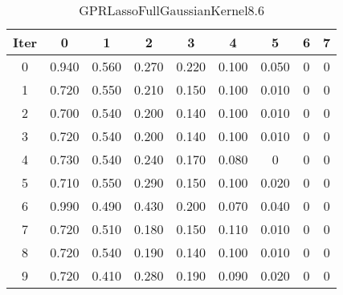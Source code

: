 \begin{table}
	\begin{center}
		\begin{tabular}{|c|c|c|c|c|c|c|c|c|}
			\hline
			Iter & 0 & 1 & 2 & 3 & 4 & 5 & 6 & 7 \\
			\hline
			0 & 0.940 & 0.560 & 0.270 & 0.220 & 0.100 & 0.050 & 0 & 0 \\
			\hline
			1 & 0.720 & 0.550 & 0.210 & 0.150 & 0.100 & 0.010 & 0 & 0 \\
			\hline
			2 & 0.700 & 0.540 & 0.200 & 0.140 & 0.100 & 0.010 & 0 & 0 \\
			\hline
			3 & 0.720 & 0.540 & 0.200 & 0.140 & 0.100 & 0.010 & 0 & 0 \\
			\hline
			4 & 0.730 & 0.540 & 0.240 & 0.170 & 0.080 & 0 & 0 & 0 \\
			\hline
			5 & 0.710 & 0.550 & 0.290 & 0.150 & 0.100 & 0.020 & 0 & 0 \\
			\hline
			6 & 0.990 & 0.490 & 0.430 & 0.200 & 0.070 & 0.040 & 0 & 0 \\
			\hline
			7 & 0.720 & 0.510 & 0.180 & 0.150 & 0.110 & 0.010 & 0 & 0 \\
			\hline
			8 & 0.720 & 0.540 & 0.190 & 0.140 & 0.100 & 0.010 & 0 & 0 \\
			\hline
			9 & 0.720 & 0.410 & 0.280 & 0.190 & 0.090 & 0.020 & 0 & 0 \\
			\hline
		\end{tabular}
	\end{center}
	\caption{GPRLassoFullGaussianKernel8.6}
\end{table}